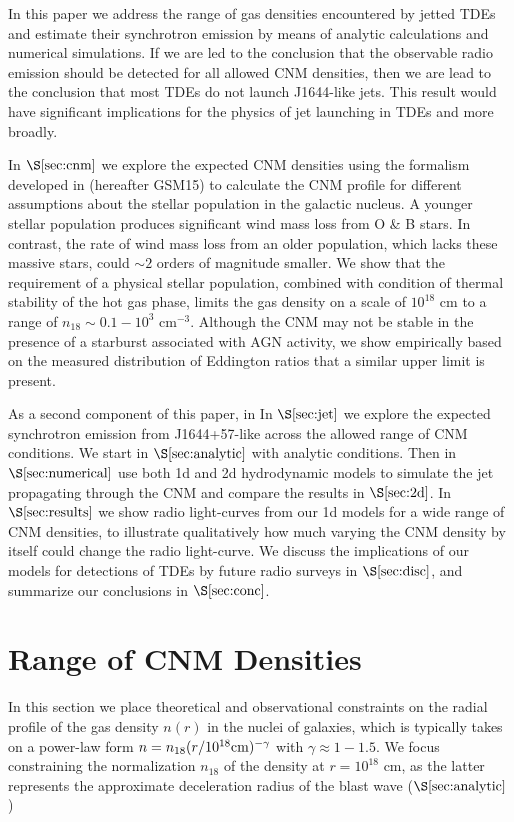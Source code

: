 \documentclass[usenatbib,fleqn]{mnras}
\begin{document}
In this paper we address the range of gas densities encountered by jetted TDEs and estimate their synchrotron emission by means of analytic calculations and numerical simulations.   If we are led to the conclusion that the observable radio emission should be detected for all allowed CNM densities, then we are lead to the conclusion that most TDEs do not launch J1644-like jets.  This result would have significant implications for the physics of jet launching in TDEs and more broadly.  

In $\S\ref{sec:cnm}$ we explore the expected CNM densities using the formalism developed in \citet{Generozov+2015} (hereafter GSM15) to calculate the CNM profile for different assumptions about the stellar population in the galactic nucleus.  A younger stellar population produces significant wind mass loss from O \& B stars. In contrast, the rate of wind mass loss from an older population, which lacks these massive stars, could $\sim 2$ orders of magnitude smaller.  We show that the requirement of a physical stellar population, combined with condition of thermal stability of the hot gas phase, limits the gas density on a scale of $10^{18}$ cm to a range of $n_{18} \sim 0.1-10^{3}$ cm$^{-3}$.  Although the CNM may not be stable in the presence of a starburst associated with AGN activity, we show empirically based on the measured distribution of Eddington ratios that a similar upper limit is present.  

As a second component of this paper, in In $\S\ref{sec:jet}$ we explore the expected synchrotron emission from J1644+57-like across the allowed range of CNM conditions.  We start in $\S\ref{sec:analytic}$ with analytic conditions.  Then in $\S\ref{sec:numerical}$ use both 1d and 2d hydrodynamic models to simulate the jet propagating through the CNM and compare the results in $\S\ref{sec:2d}$. In $\S\ref{sec:results}$ we show radio light-curves from our 1d models for a wide range of CNM densities, to illustrate qualitatively how much varying the CNM density by itself
could change the radio light-curve.  We discuss the implications of our models for detections of TDEs by future radio surveys in
$\S\ref{sec:disc}$, and summarize our conclusions in $\S\ref{sec:conc}$.

\section{Range of CNM Densities}
\label{sec:cnm}

In this section we place theoretical and observational constraints on the radial profile of the gas density $n(r)$ in the nuclei of galaxies, which is typically takes on a power-law form $n = n_{18}(r/10^{18}{\rm cm})^{-\gamma}$ with $\gamma \approx 1-1.5$.  We focus constraining the normalization $n_{18}$ of the density at $r = 10^{18}$ cm, as the latter represents the approximate deceleration radius of the blast wave ($\S\ref{sec:analytic}$) 
\end{document}

